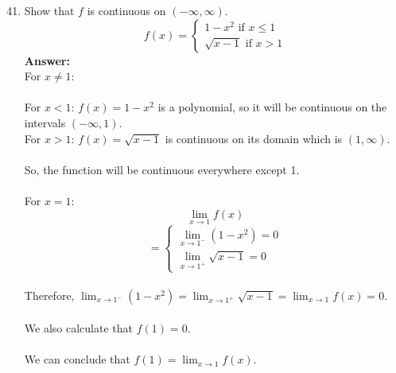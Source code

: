 \documentclass[12pt]{article}
\begin{document}
\begin{enumerate}
\setcounter{enumi}{40}
    \item Show that $f$ is continuous on $(- \infty, \infty)$.
        \[ f(x) = \left \{ \begin{array}{l}
    1 - x^2 \text{ if } x \leqslant 1 \\
   \sqrt{x - 1} \text{ if } x > 1 \end{array} \right.  \] 
   \textbf{Answer: }\\
   For $x \neq 1$:\\~\\
        For $x < 1$: $f(x) = 1 - x^2$ is a polynomial, so it will be continuous on the intervals $(-\infty, 1)$.\\
        For $x > 1$: $f(x) = \sqrt{x - 1}$ is continuous on its domain which is $(1, \infty)$.\\~\\
   So, the function will be continuous everywhere except 1. \\~\\
   For $x = 1$:
   \[{\displaystyle \lim_{x \to 1} f(x)}\]
   \[ = \left \{ \begin{array}{l}
    {\displaystyle \lim_{x \to 1^-} (1 - x^2)} = 0 \\
    {\displaystyle \lim_{x \to 1^+} \sqrt{x-1}} = 0 \end{array} \right.  \] \\
    Therefore, ${\displaystyle \lim_{x \to 1^-} (1 - x^2) = \lim_{x \to 1^+} \sqrt{x-1} = \lim_{x \to 1} f(x) = 0 }$.\\~\\
    We also calculate that $f(1) = 0$.\\~\\
    We can conclude that $f(1) = {\displaystyle \lim_{x \to 1} f(x)}$.\\~\\
    \noindent{}\\~\\
\end{enumerate}
\end{document}
